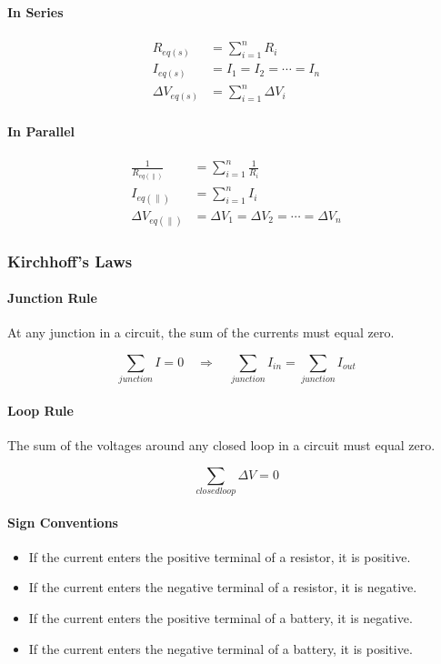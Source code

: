 \paragraph*{In Series}

\begin{align*}
    R_{eq(s)} &= \sum_{i=1}^{n} R_i\\
    I_{eq(s)} &= I_1 = I_2 = \cdots = I_n\\
    \Delta V_{eq(s)} &= \sum_{i=1}^{n} \Delta V_i
\end{align*}

\paragraph*{In Parallel}
\begin{align*}
    \frac{1}{R_{eq(\parallel)}} &= \sum_{i=1}^{n} \frac{1}{R_i}\\
    I_{eq(\parallel)} &= \sum_{i=1}^{n} I_i\\
    \Delta V_{eq(\parallel)} &= \Delta V_1 = \Delta V_2 = \cdots = \Delta V_n
\end{align*}


\subsubsection*{Kirchhoff's Laws}

\paragraph*{Junction Rule}
At any junction in a circuit, the sum of the currents must equal zero.

\begin{equation*}
    \sum_{junction} I = 0 \quad \Longrightarrow \quad \sum_{junction} I_{in} = \sum_{junction} I_{out}
\end{equation*}

\paragraph*{Loop Rule}
The sum of the voltages around any closed loop in a circuit must equal zero.

\begin{equation*}
    \sum_{closed loop} \Delta V = 0
\end{equation*}

\paragraph*{Sign Conventions}
\begin{itemize}
    \item If the current enters the positive terminal of a resistor, it is positive.
    \item If the current enters the negative terminal of a resistor, it is negative.
    \item If the current enters the positive terminal of a battery, it is negative.
    \item If the current enters the negative terminal of a battery, it is positive.
\end{itemize}

